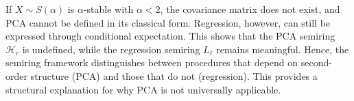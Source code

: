 If $X \sim S(\alpha)$ is $\alpha$-stable with $\alpha < 2$, the covariance matrix does not exist, and PCA cannot be defined in its classical form. Regression, however, can still be expressed through conditional expectation. This shows that the PCA semiring $\mathcal{H}_r$ is undefined, while the regression semiring $L_\ell$ remains meaningful. Hence, the semiring framework distinguishes between procedures that depend on second-order structure (PCA) and those that do not (regression). This provides a structural explanation for why PCA is not universally applicable.





